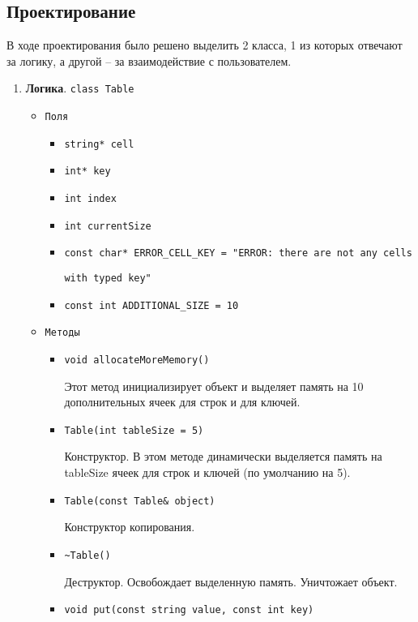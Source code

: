 \documentclass[12pt,a4paper]{report}
\begin{document}
\subsection{Проектирование}
\hspace{\parindent}
В ходе проектирования было решено выделить 2 класса, 1 из которых отвечают за логику, а другой -- за взаимодействие с пользователем.
\begin{enumerate}
\item \textbf{Логика}. \verb+class Table+
\hspace{\parindent}

\begin{itemize}
\item \verb+Поля+
\begin{itemize}
\item \verb+string* cell+
\item \verb+int* key+
\item \verb+int index+
\item \verb+int currentSize+
\item \verb+const char* ERROR_CELL_KEY = "ERROR: there are not any cells+

\begin{flushright}
\verb+with typed key"+
\end{flushright}
\item \verb+const int ADDITIONAL_SIZE = 10+
\end{itemize}
\item \verb+Методы+
\begin{itemize}
\item \verb+void allocateMoreMemory()+

Этот метод инициализирует объект и выделяет память на 10 дополнительных ячеек для строк и для ключей.
\item \verb+Table(int tableSize = 5)+

Конструктор. В этом методе динамически выделяется память на tableSize ячеек для строк и ключей (по умолчанию на 5).
\item \verb+Table(const Table& object)+

Конструктор копирования.
\item \verb+~Table()+

Деструктор. Освобождает выделенную память. Уничтожает объект.
\item \verb+void put(const string value, const int key)+


\end{itemize}
\end{itemize}
\end{enumerate}
\end{document}
